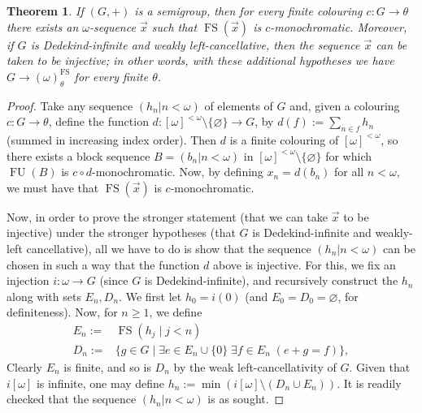 \documentclass{amsart}
\newtheorem{theorem}{Theorem}[section]
\theoremstyle{definition}
\theoremstyle{remark}
\numberwithin{equation}{section}
\begin{document}
\begin{theorem}\label{fin-inf-hindman}
    If $(G, +)$ is a semigroup, then for every finite colouring \linebreak$c:G\longrightarrow\theta$ there exists an $\omega$-sequence $\vec{x}$ such that $\operatorname{FS}(\vec{x})$ is $c$-monochromatic. Moreover, if $G$ is Dedekind-infinite and weakly left-cancellative, then the sequence $\vec{x}$ can be taken to be injective; in other words, with these additional hypotheses we have $G\to(\omega)^{\operatorname{FS}}_{\theta}$ for every finite $\theta$.
\end{theorem}
\begin{proof}
    Take any sequence $(h_n\big|n<\omega)$ of elements of $G$ and, given a colouring $c:G\longrightarrow\theta$, define the function $d:[\omega]^{<\omega}\setminus\{\varnothing\}\to G$, by $d(f):=\sum_{n\in f}h_{n}$ (summed in increasing index order). Then $d$ is a finite colouring of $[\omega]^{<\omega}$, so there exists a block sequence $B=(b_{n}|n<\omega)$ in $[\omega]^{<\omega}\setminus\{\varnothing\}$ for which $\operatorname{FU}(B)$ is $c\circ d$-monochromatic. Now, by defining $x_n=d(b_{n})$ for all $n<\omega$, we must have that $\operatorname{FS}(\vec{x})$ is $c$-monochromatic.

    Now, in order to prove the stronger statement (that we can take $\vec{x}$ to be injective) under the stronger hypotheses (that $G$ is Dedekind-infinite and weakly-left cancellative), all we have to do is show that the sequence $(h_n\big|n<\omega)$ can be chosen in such a way that the function $d$ above is injective. For this, we fix an injection $i:\omega\to G$ (since $G$ is Dedekind-infinite), and recursively construct the $h_n$ along with sets $E_n,D_n$. We first let $h_0=i(0)$ (and $E_0=D_0=\varnothing$, for definiteness). Now, for $n\geq 1$, we define
%            
    \begin{align*}
        E_{n}:=&\operatorname{FS}(h_{j}\mid j<n)\\
                D_{n}:=&\{g\in G\mid\exists e\in E_{n}\cup\{0\}\;\exists f\in E_n\;(e+g=f)\big\},
    \end{align*}
    Clearly $E_{n}$ is finite, and so is $D_{n}$ by the weak left-cancellativity of $G$. Given that $i[\omega]$ is infinite, one may define $h_{n}:=\min(i[\omega]\setminus(D_{n}\cup E_{n}))$. It is readily checked that the sequence $(h_n\big|n<\omega)$ is as sought.
\qedhere
\end{proof}
\end{document}
